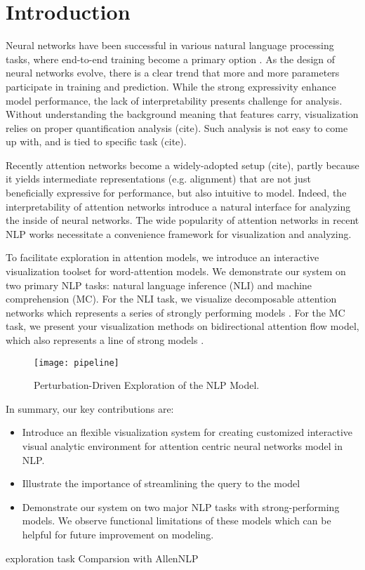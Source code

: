 \section{Introduction}

Neural networks have been successful in various natural language processing tasks,
where end-to-end training become a primary option \cite{Seo2016}.
As the design of neural networks evolve, there is a clear trend that more and more
parameters participate in training and prediction. While the strong expressivity
enhance model performance, the lack of interpretability presents challenge for analysis.
Without understanding the background meaning that features carry, visualization relies
on proper quantification analysis (cite). Such analysis is not easy to come up with,
and is tied to specific task (cite).

Recently attention networks become a widely-adopted setup (cite), partly because it yields
intermediate representations (e.g. alignment) that are not just beneficially expressive for performance,
but also intuitive to model. Indeed, the interpretability of attention networks introduce
a natural interface for analyzing the inside of neural networks. The wide popularity of attention networks
in recent NLP works necessitate a convenience framework for visualization and analyzing.

To facilitate exploration in attention models, we introduce an interactive visualization toolset
for word-attention models. We demonstrate our system on two primary NLP tasks: natural language
inference (NLI) and machine comprehension (MC). For the NLI task, we visualize
decomposable attention networks which represents a series of strongly performing models \cite{}.
For the MC task, we present your visualization methods on bidirectional attention flow model,
which also represents a line of strong models \cite{}.

\begin{figure}[htbp]
\centering
\vspace{-2mm}
 \texttt{[image: pipeline]}
 \caption{
 Perturbation-Driven Exploration of the NLP Model.
 }
\label{fig:modelPipeline}
\end{figure}


In summary, our key contributions are:
\begin{itemize}
	\item Introduce an flexible visualization system for creating customized interactive visual analytic environment for attention centric neural networks model in NLP. 
	\item Illustrate the importance of streamlining the query to the model
	\item Demonstrate our system on two major NLP tasks with strong-performing
	models. We observe functional limitations of these models which can be helpful
	for future improvement on modeling.
\end{itemize}


exploration task
\cite{Seo2016}
Comparsion with AllenNLP
